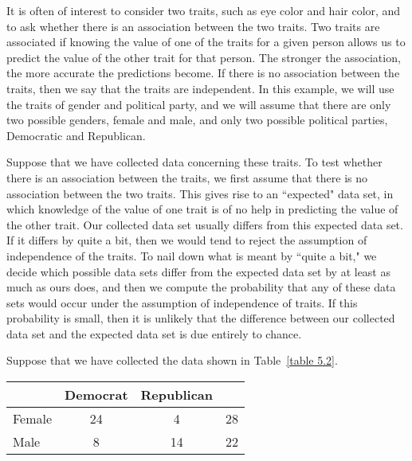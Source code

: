 \begin{example}\label{exam 5.6} It is often of interest to consider two traits, such
as eye color and hair color, and to ask whether there is an association between the
two traits.  Two traits are associated if knowing the value of one of the traits for a
given person allows us to predict the value of the other trait for that person.  The
stronger the association, the more accurate the predictions become.  If there is no
association between the traits, then we say that the traits are independent.  In this
example, we will use the traits of gender and political party, and we will assume that
there are only two possible genders, female and male, and only two possible political
parties, Democratic and Republican.
\par Suppose that we have collected data concerning these traits.  To test whether
there is an association between the traits, we first assume that there is no
association between the two traits.  This gives rise to an ``expected" data set, in
which knowledge of the value of one trait is of no help in predicting the value of the
other trait.  Our collected data set usually differs from this expected data set.  If
it differs by quite a bit, then we would tend to reject the assumption of independence
of the traits.  To nail down what is meant by ``quite a bit," we decide which
possible data sets differ from the expected data set by at least as much as ours does,
and then we compute the probability that any of these data sets would occur under the
assumption of independence of traits.  If this probability is small, then it is
unlikely that the difference between our collected data set and the expected data set
is due entirely to chance.
\par Suppose that we have collected the data shown in Table~\ref{table 5.2}.
\begin{table}
\centering
\begin{tabular}{|l|c|c|c|}
\hline
       & \hspace{.15in}Democrat\hspace{.15in} & \hspace{.1in}Republican\hspace{.1in} & \\ \hline 
\hspace{.1in}Female & 24                  &\hspace{.02in} 4 & \hspace{.2in} 28  \\ \hline 
\hspace{.1in}Male   &\hspace{.075in}8     & 14               & \hspace{.2in} 22  \\ \hline

\end{tabular}
\end{table}
\end{example}
